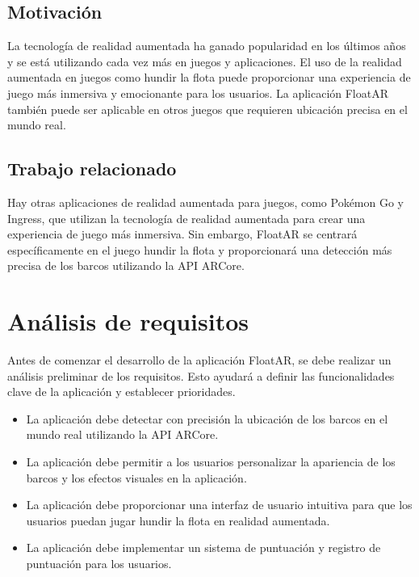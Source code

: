 \documentclass[a4paper,openright,12pt]{article}
\begin{document}
\subsection{Motivación}
La tecnología de realidad aumentada ha ganado popularidad en los últimos años y se está utilizando cada vez más en juegos y aplicaciones. El uso de la realidad aumentada en juegos como hundir la flota puede proporcionar una experiencia de juego más inmersiva y emocionante para los usuarios. La aplicación FloatAR también puede ser aplicable en otros juegos que requieren ubicación precisa en el mundo real.

\subsection{Trabajo relacionado}
Hay otras aplicaciones de realidad aumentada para juegos, como Pokémon Go y Ingress, que utilizan la tecnología de realidad aumentada para crear una experiencia de juego más inmersiva. Sin embargo, FloatAR se centrará específicamente en el juego hundir la flota y proporcionará una detección más precisa de los barcos utilizando la API ARCore.

\section{Análisis de requisitos}
Antes de comenzar el desarrollo de la aplicación FloatAR, se debe realizar un análisis preliminar de los requisitos. Esto ayudará a definir las funcionalidades clave de la aplicación y establecer prioridades.
\begin{itemize}
\item La aplicación debe detectar con precisión la ubicación de los barcos en el mundo real utilizando la API ARCore.
\item La aplicación debe permitir a los usuarios personalizar la apariencia de los barcos y los efectos visuales en la aplicación.
\item La aplicación debe proporcionar una interfaz de usuario intuitiva para que los usuarios puedan jugar hundir la flota en realidad aumentada.
\item La aplicación debe implementar un sistema de puntuación y registro de puntuación para los usuarios.
\end{itemize}
\end{document}
